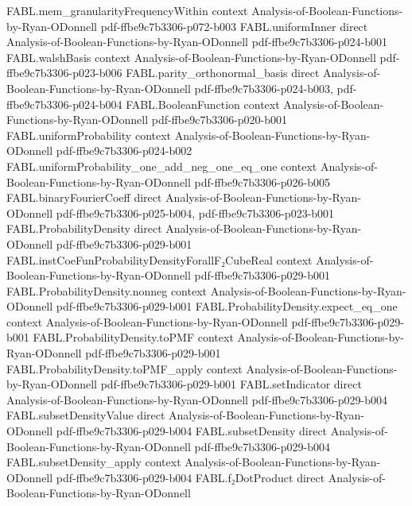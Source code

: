 \begin{theorem}
\proofstep
  {FABL.mem_granularityFrequencyWithin}
  {context}
  {Analysis-of-Boolean-Functions-by-Ryan-ODonnell}
  {pdf-ffbe9c7b3306-p072-b003}
\proofstep
  {FABL.uniformInner}
  {direct}
  {Analysis-of-Boolean-Functions-by-Ryan-ODonnell}
  {pdf-ffbe9c7b3306-p024-b001}
\proofstep
  {FABL.walshBasis}
  {context}
  {Analysis-of-Boolean-Functions-by-Ryan-ODonnell}
  {pdf-ffbe9c7b3306-p023-b006}
\proofstep
  {FABL.parity_orthonormal_basis}
  {direct}
  {Analysis-of-Boolean-Functions-by-Ryan-ODonnell}
  {pdf-ffbe9c7b3306-p024-b003,
    pdf-ffbe9c7b3306-p024-b004}
\proofstep
  {FABL.BooleanFunction}
  {context}
  {Analysis-of-Boolean-Functions-by-Ryan-ODonnell}
  {pdf-ffbe9c7b3306-p020-b001}
\proofstep
  {FABL.uniformProbability}
  {context}
  {Analysis-of-Boolean-Functions-by-Ryan-ODonnell}
  {pdf-ffbe9c7b3306-p024-b002}
\proofstep
  {FABL.uniformProbability_one_add_neg_one_eq_one}
  {context}
  {Analysis-of-Boolean-Functions-by-Ryan-ODonnell}
  {pdf-ffbe9c7b3306-p026-b005}
\proofstep
  {FABL.binaryFourierCoeff}
  {direct}
  {Analysis-of-Boolean-Functions-by-Ryan-ODonnell}
  {pdf-ffbe9c7b3306-p025-b004,
    pdf-ffbe9c7b3306-p023-b001}
\proofstep
  {FABL.ProbabilityDensity}
  {direct}
  {Analysis-of-Boolean-Functions-by-Ryan-ODonnell}
  {pdf-ffbe9c7b3306-p029-b001}
\proofstep
  {FABL.instCoeFunProbabilityDensityForallF₂CubeReal}
  {context}
  {Analysis-of-Boolean-Functions-by-Ryan-ODonnell}
  {pdf-ffbe9c7b3306-p029-b001}
\proofstep
  {FABL.ProbabilityDensity.nonneg}
  {context}
  {Analysis-of-Boolean-Functions-by-Ryan-ODonnell}
  {pdf-ffbe9c7b3306-p029-b001}
\proofstep
  {FABL.ProbabilityDensity.expect_eq_one}
  {context}
  {Analysis-of-Boolean-Functions-by-Ryan-ODonnell}
  {pdf-ffbe9c7b3306-p029-b001}
\proofstep
  {FABL.ProbabilityDensity.toPMF}
  {context}
  {Analysis-of-Boolean-Functions-by-Ryan-ODonnell}
  {pdf-ffbe9c7b3306-p029-b001}
\proofstep
  {FABL.ProbabilityDensity.toPMF_apply}
  {context}
  {Analysis-of-Boolean-Functions-by-Ryan-ODonnell}
  {pdf-ffbe9c7b3306-p029-b001}
\proofstep
  {FABL.setIndicator}
  {direct}
  {Analysis-of-Boolean-Functions-by-Ryan-ODonnell}
  {pdf-ffbe9c7b3306-p029-b004}
\proofstep
  {FABL.subsetDensityValue}
  {direct}
  {Analysis-of-Boolean-Functions-by-Ryan-ODonnell}
  {pdf-ffbe9c7b3306-p029-b004}
\proofstep
  {FABL.subsetDensity}
  {direct}
  {Analysis-of-Boolean-Functions-by-Ryan-ODonnell}
  {pdf-ffbe9c7b3306-p029-b004}
\proofstep
  {FABL.subsetDensity_apply}
  {context}
  {Analysis-of-Boolean-Functions-by-Ryan-ODonnell}
  {pdf-ffbe9c7b3306-p029-b004}
\proofstep
  {FABL.f₂DotProduct}
  {direct}
  {Analysis-of-Boolean-Functions-by-Ryan-ODonnell}

\end{theorem}
